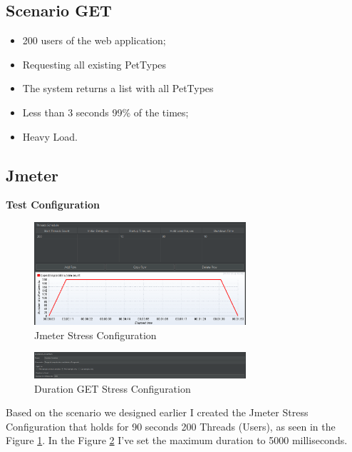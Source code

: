 \documentclass[a4paper,11pt,openright,BCOR=15mm]{scrbook}
\begin{document}
		\subsection{Scenario GET}
		\begin{itemize}
			\item 200 users of the web application;
			\item Requesting all existing PetTypes
			\item The system returns a list with all PetTypes
			\item Less than 3 seconds 99\% of the times;
			\item Heavy Load.
		\end{itemize}

		\subsection{Jmeter}
		\textbf{Test Configuration}
		\begin{figure}[H]
			\centering
			\includegraphics[width=0.7\textwidth]{figs/Performance/Test Configuration/JMETER-STRESS.png}
			\caption{Jmeter Stress Configuration}
			\label{fig:JMETER-STRESS}
		\end{figure}
		\begin{figure}[H]
			\centering
			\includegraphics[width=0.7\textwidth]{figs/Performance/Test Configuration/Duration-Stress.png}
			\caption{Duration GET Stress Configuration}
			\label{fig:DurationGetStress}
		\end{figure}

		Based on the scenario we designed earlier I created the Jmeter Stress Configuration that holds for 90 seconds 200 Threads (Users), as seen in the Figure \ref{fig:JMETER-STRESS}. In the Figure \ref{fig:DurationGetStress} I've set the maximum duration to 5000 milliseconds.
\end{document}
